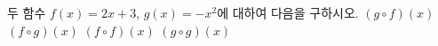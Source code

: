 두 함수 $f(x)=2x+3$, $g(x)=-x^2$에 대하여 다음을 구하시오.
 $(g\circ f)(x)$
 $(f\circ g)(x)$
 $(f\circ f)(x)$
 $(g\circ g)(x)$
